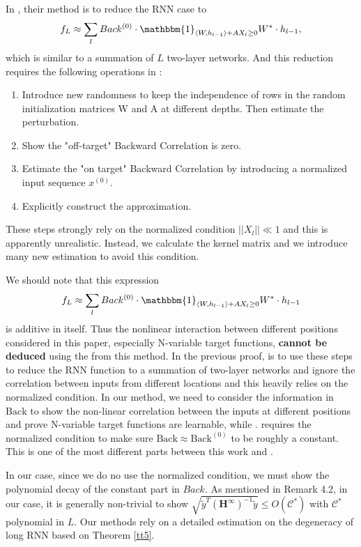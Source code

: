\documentclass{article}
\begin{document}
In   \cite{allenzhu2019sgd}, their method is to reduce the RNN case to $$f_L\approx\sum_lBack^{(0)} \cdot \mathbbm{1}_{\langle W, h_{l-1}\rangle+AX_l\geq 0} W^* \cdot h_{l-1},$$
which is similar to a summation of $L$ two-layer networks. And this reduction requires the following  operations in  \cite{allenzhu2019sgd}:
\begin{enumerate}[1)]
	\item  Introduce new randomness to keep the independence of rows in the random initialization matrices W and A at different depths. Then estimate the perturbation.
	\item Show the "off-target" Backward Correlation is zero.
	\item  Estimate the "on target" Backward Correlation by introducing a normalized input sequence $x^{(0)}$.
	\item  Explicitly construct the approximation.
\end{enumerate}

These steps  strongly rely on the normalized condition $||X_l||\ll 1 $ and this is  apparently  unrealistic. Instead, we  calculate the kernel matrix and  we introduce many new estimation to avoid this condition.

We should note that this expression $$f_L\approx\sum_lBack^{(0)} \cdot \mathbbm{1}_{\langle W, h_{l-1}\rangle+AX_l\geq 0} W^* \cdot h_{l-1}$$ is additive in itself. Thus  the nonlinear interaction between different positions  considered in this paper, especially N-variable target functions, {\bf cannot  be deduced} using the from this  method. In the previous proof,  \cite{allenzhu2019sgd}  is to use these steps to reduce the RNN function to a summation of two-layer networks  and ignore the correlation between inputs from different locations and this heavily relies on the normalized condition. In our method, we need  to consider the information in $\text{Back}$ to show the non-linear  correlation between the inputs at different positions and prove  N-variable target functions are learnable, while \cite{allenzhu2019sgd}.  requires  the normalized condition to make sure  $\text{Back}\approx \text{Back}^{(0)}$ to be roughly a constant. This is one of the most different parts between this work and  \cite{allenzhu2019sgd}.

In our case, since we do no use the normalized condition, we must show the polynomial decay of the constant part in $Back$. As mentioned in Remark 4.2, in our case, it is generally  non-trivial to show $\sqrt{\widetilde{y}^T (\bm{H}^\infty)^{-1}\widetilde{y}}\leq O(\mathscr{C}^*)$ with $\mathscr{C}^*$ polynomial in $L$. Our methods rely on a detailed estimation on the degeneracy of long RNN based on Theorem \ref{tt5}.
\end{document}
